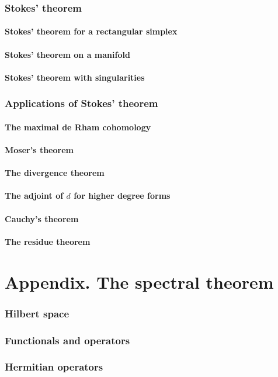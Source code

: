 \documentclass[a4paper]{article}
\begin{document}
\section{Stokes' theorem}

\subsection{Stokes' theorem for a rectangular simplex}

\subsection{Stokes' theorem on a manifold}

\subsection{Stokes' theorem with singularities}

\section{Applications of Stokes' theorem}

\subsection{The maximal de Rham cohomology}

\subsection{Moser's theorem}

\subsection{The divergence theorem}

\subsection{The adjoint of $d$ for higher degree forms}

\subsection{Cauchy's theorem}

\subsection{The residue theorem}

\part*{Appendix. The spectral theorem}

\section{Hilbert space}

\section{Functionals and operators}

\section{Hermitian operators}
\end{document}
